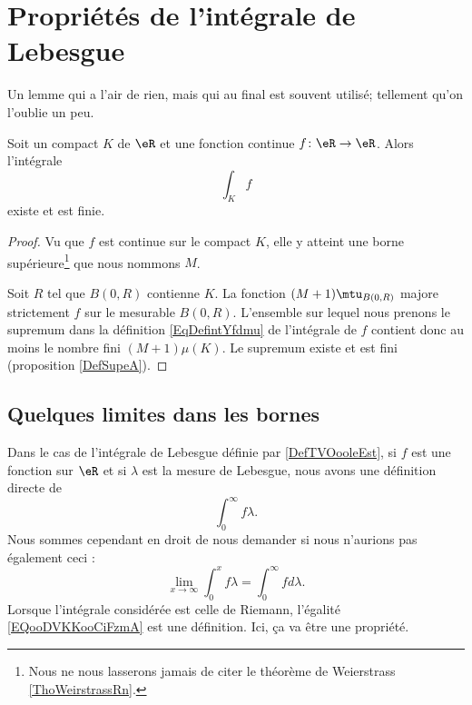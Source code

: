 
\section{Propriétés de l'intégrale de Lebesgue}

Un lemme qui a l'air de rien, mais qui au final est souvent utilisé; tellement qu'on l'oublie un peu.
\begin{lemma}       \label{LEMooWKSWooPptdEm}
    Soit un compact \( K\) de \( \eR\) et une fonction continue \( f\colon \eR\to \eR\). Alors l'intégrale
    \begin{equation}
        \int_Kf
    \end{equation}
    existe et est finie.
\end{lemma}

\begin{proof}
    Vu que \( f\) est continue sur le compact \( K\), elle y atteint une borne supérieure\footnote{Nous ne nous lasserons jamais de citer le théorème de Weierstrass \ref{ThoWeirstrassRn}.} que nous nommons \( M\).

    Soit \( R\) tel que \( B(0,R)\) contienne \( K\). La fonction \( (M+1)\mtu_{B(0,R)}\) majore strictement \( f\) sur le mesurable \( B(0,R)\). L'ensemble sur lequel nous prenons le supremum dans la définition \eqref{EqDefintYfdmu} de l'intégrale de \( f\) contient donc au moins le nombre fini \( (M+1)\mu(K)\). Le supremum existe et est fini (proposition \ref{DefSupeA}).
\end{proof}

\subsection{Quelques limites dans les bornes}

Dans le cas de l'intégrale de Lebesgue définie par \ref{DefTVOooleEst}, si \( f\) est une fonction sur \( \eR\) et si \( \lambda\) est la mesure de Lebesgue, nous avons une définition directe de
\begin{equation}
    \int_{0}^{\infty}f\lambda.
\end{equation}
Nous sommes cependant en droit de nous demander si nous n'aurions pas également ceci :
\begin{equation}        \label{EQooDVKKooCiFzmA}
    \lim_{x\to \infty} \int_0^xf\lambda=\int_0^{\infty}fd\lambda.
\end{equation}
Lorsque l'intégrale considérée est celle de Riemann, l'égalité \eqref{EQooDVKKooCiFzmA} est une définition. Ici, ça va être une propriété.

